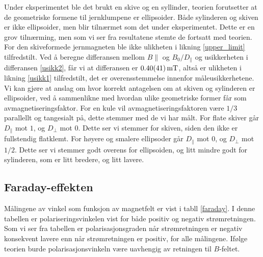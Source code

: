\documentclass[%
 reprint,
 amsmath,amssymb,
 aps,
]{revtex4-1}
\begin{document}
Under eksperimentet ble det brukt en skive og en syllinder, teorien forutsetter at de geometriske formene til jernklumpene er ellipsoider. Både sylinderen og skiven er ikke ellipsoider, men blir tilnærmet som det under eksperimentet. Dette er en grov tilnærming, men som vi ser fra resultatene stemte de fortsatt med teorien. For den skiveformede jernmagneten ble ikke ulikheten i likning \eqref{upper_limit} tilfredstilt. Ved å beregne differansen mellom $B\parallel$ og $B_0/D_{\parallel}$ og usikkerheten i differansen \eqref{usikk2}, får vi at differansen er $\SI{0.4\pm0.41}{\milli\tesla}$, altså er ulikheten i likning \eqref{usikk1} tilfredstilt, det er overensstemmelse innenfor måleusikkerhetene.\\
Vi kan gjøre at anslag om hvor korrekt antagelsen om at skiven og sylinderen er ellipsoider, ved å sammenlikne med hvordan ulike geometriske former får som avmagnetiseringsfaktor. For en kule vil avmagnetiseringsfaktoren være $1/3$ parallellt og tangesialt på, dette stemmer med de vi har målt. For flate skiver går $D_{\parallel}$ mot $1$, og $D_{\perp}$ mot $0$. Dette ser vi stemmer for skiven, siden den ikke er fullstendig flatklemt. For høyere og smalere ellipsoder går $D_{\parallel}$ mot $0$, og $D_{\perp}$ mot $1/2$. Dette ser vi stemmer godt overens for ellipsoiden, og litt mindre godt for sylinderen, som er litt bredere, og litt lavere.
\subsection{Faraday-effekten}
Målingene av vinkel som funksjon av magnetfelt er vist i tabll \vref{faraday}. I denne tabellen er polariseringsvinkelen vist for både positiv og negativ strømretningen. Som vi ser fra tabellen er polarisasjonsgraden når strømretningen er negativ konsekvent lavere enn når strømretningen er positiv, for alle målingene. Ifølge teorien burde polarisasjonsvinkeln være uavhengig av retningen til $B$-feltet. 
{}

\end{document}
